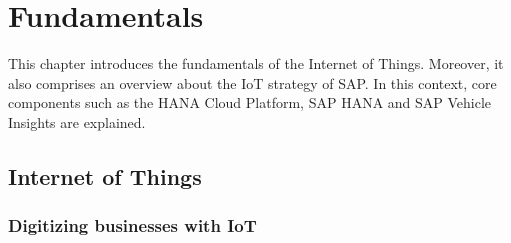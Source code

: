 \chapter{Fundamentals}
\label{cha:Fundamentals}
This chapter introduces the fundamentals of the Internet of Things. Moreover, it
also comprises an overview about the IoT strategy of SAP. In this context, core
components such as the HANA Cloud Platform, SAP HANA and SAP
Vehicle Insights are explained.
 
\section{Internet of Things}
\subsection{Digitizing businesses with IoT}
\label{iot}
